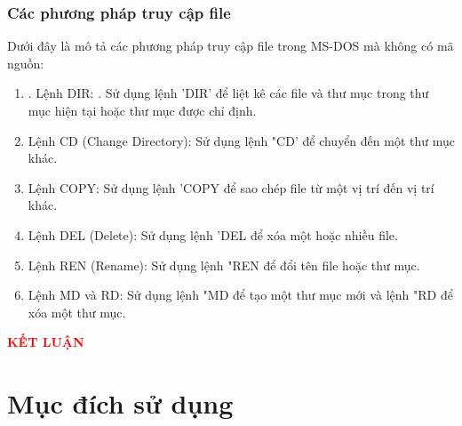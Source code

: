 \documentclass[12pt,a4paper]{article}
\begin{document}
\subsubsection{Các phương pháp truy cập file}
Dưới đây là mô tả các phương pháp truy cập file trong MS-DOS mà không có mã nguồn:
\begin{enumerate}
	\item . Lệnh DIR:
	. Sử dụng lệnh 'DIR' để liệt kê các file và thư mục trong thư mục hiện tại hoặc thư mục được chỉ định.
	\item Lệnh CD (Change Directory):
	Sử dụng lệnh "CD' để chuyển đến một thư mục khác.
	
	\item Lệnh COPY:
	Sử dụng lệnh 'COPY để sao chép file từ một vị trí đến vị trí khác.
	
	\item Lệnh DEL (Delete):
	Sử dụng lệnh 'DEL để xóa một hoặc nhiều file.
	
	\item Lệnh REN (Rename):
	Sử dụng lệnh "REN để đổi tên file hoặc thư mục.
	
	\item Lệnh MD và RD:
	Sử dụng lệnh "MD để tạo một thư mục mới và lệnh "RD để xóa một thư mục.
	

\end{enumerate}
\newpage
{}
\begin{center}
	{\fontsize{30}{14}\selectfont \textbf{\textcolor{red}{KẾT LUẬN}}}
\end{center}
\setcounter{section}{0}
\section{Mục đích sử dụng}
\end{document}
